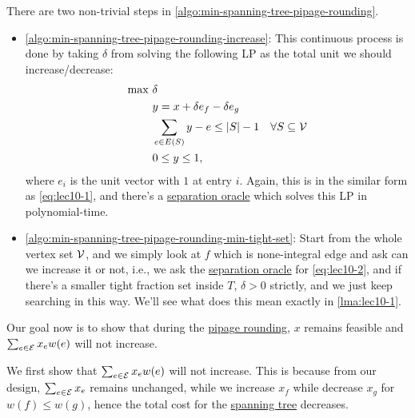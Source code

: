 \begin{remark}
	There are two non-trivial steps in \autoref{algo:min-spanning-tree-pipage-rounding}.
	\begin{itemize}
		\item \autoref{algo:min-spanning-tree-pipage-rounding-increase}: This continuous process is done by taking \(\delta \) from solving the following LP as the total unit we should increase/decrease:
		      \begin{equation}\label{eq:lec10-2}
			      \begin{aligned}
				      \max~ & \delta                                                                                                    \\
				            & y = x+\delta e_f - \delta e_g                                                                             \\
				            & \sum_{e\in E(S)} y- e \leq \left\vert S \right\vert - 1 & \forall S \subseteq \mathcal{\MakeUppercase{v}} \\
				            & 0 \leq y \leq 1,
			      \end{aligned}
		      \end{equation}
		      where \(e_i\) is the unit vector with \(1\) at entry \(i\). Again, this is in the similar form as \autoref{eq:lec10-1}, and there's a \hyperref[rmk:separation-oracle]{separation oracle} which solves this LP in polynomial-time.
		\item \autoref{algo:min-spanning-tree-pipage-rounding-min-tight-set}: Start from the whole vertex set \(\mathcal{\MakeUppercase{v}} \), and we simply look at \(f\) which is none-integral edge and ask can we increase it or not, i.e., we ask the \hyperref[rmk:separation-oracle]{separation oracle} for \autoref{eq:lec10-2}, and if there's a smaller tight fraction set inside \(T\), \(\delta > 0\) strictly, and we just keep searching in this way. We'll see what does this mean exactly in \autoref{lma:lec10-1}.
	\end{itemize}
\end{remark}

Our goal now is to show that during the \hyperref[algo:min-spanning-tree-pipage-rounding-rounding]{pipage rounding}, \(x\) remains feasible and \(\sum_{e\in \mathcal{\MakeUppercase{e}} } x_e w(e)\) will not increase.

We first show that \(\sum_{e\in \mathcal{\MakeUppercase{e}} } x_e w(e)\) will not increase. This is because from our design, \(\sum_{e\in \mathcal{\MakeUppercase{e}} }x_e \) remains unchanged, while we increase \(x_f\) while decrease \(x_g\) for \(w(f) \leq w(g)\), hence the total cost for the \hyperref[def:spanning-tree]{spanning tree} decreases.

